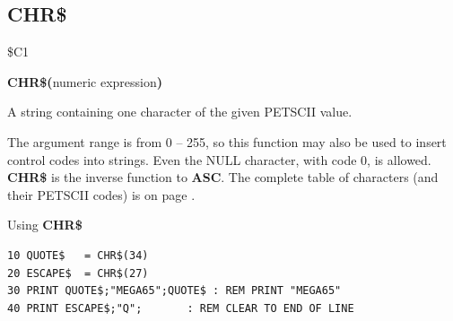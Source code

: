 
\newpage
{}
\subsection{CHR\$}
\label{BASIC 65 Functions!CHR}
\begin{description}[leftmargin=2cm,style=nextline]
\item [Token:] \$C1
\item [Format:] {\bf CHR\$(}numeric expression{\bf)}
\item [Returns:] A string containing one character of the given PETSCII
               value.

\item [Remarks:] The argument range is from 0 -- 255, so this function may
                 also be used to insert control codes into strings.
                 Even the NULL character, with code 0, is allowed. \\
                 {\bf CHR\$} is the inverse function to {\bf ASC}.
                 The complete table of characters (and their PETSCII codes) is
                 on page \pageref{appendix:asciicodes}.
\item [Example:] Using {\bf CHR\$}
\begin{tcolorbox}[colback=black,coltext=white]
\verbatimfont{\codefont}
\begin{verbatim}
10 QUOTE$   = CHR$(34)
20 ESCAPE$  = CHR$(27)
30 PRINT QUOTE$;"MEGA65";QUOTE$ : REM PRINT "MEGA65"
40 PRINT ESCAPE$;"Q";       : REM CLEAR TO END OF LINE
\end{verbatim}
\end{tcolorbox}
\end{description}


\newpage
